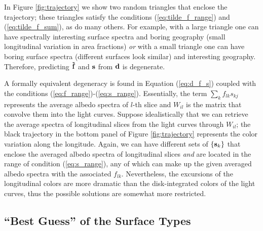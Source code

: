 \documentclass[iop,numberedappendix,apj,]{emulateapj}
\def\fast{\tilde f}
\begin{document}

In Figure \ref{fig:trajectory} we show two random triangles that enclose the trajectory; these triangles satisfy the conditions (\ref{eq:tilde_f_range}) and (\ref{eq:tilde_f_sum}), as do many others. 
For example, with a large triangle one can have spectrally interesting surface spectra and boring geography (small longitudinal variation in area fractions) {\it or} with a small triangle one can have boring surface spectra (different surfaces look similar) and interesting geography. 
Therefore, predicting ${\bf \fast }$ and ${\bf s}$ from ${\bf d}$ is degenerate.  

A formally equivalent degeneracy is found in Equation (\ref{eq:d_f_s}) coupled with the conditions (\ref{eq:f_range})-(\ref{eq:s_range}). 
Essentially, the term $\sum _k f_{lk} s_{kj}$ represents the average albedo spectra of $l$-th slice and $W_{il}$ is the matrix that convolve them into the light curves. 
Suppose idealistically that we can retrieve the average spectra of longitudinal slices from the light curves through $W_{il}$; the black trajectory in the bottom panel of Figure \ref{fig:trajectory} represents the color variation along the longitude.  
Again, we can have different sets of $\{ {\bf s}_k \}$ that enclose the averaged albedo spectra of longitudinal slices {\it and} are located in the range of condition (\ref{eq:s_range}), any of which can make up the given averaged albedo spectra with the associated $f_{lk}$. 
Nevertheless, the excursions of the longitudinal colors are more dramatic than the disk-integrated colors of the light curves, thus the possible solutions are somewhat more restricted. 


\subsection{``Best Guess'' of the Surface Types}
\label{ss:guess}
\end{document}
